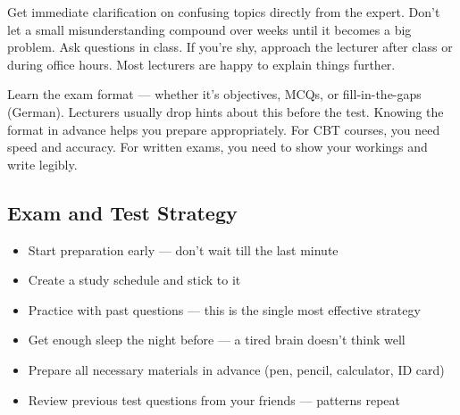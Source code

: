 \documentclass[11pt,a4paper]{article}
\begin{document}
\begin{tcolorbox}[colback=lightGray,colframe=primary,title={\color{white}\textbf{Ask Questions}},colbacktitle=primary,arc=4pt,breakable]
Get immediate clarification on confusing topics directly from the expert. Don't let a small misunderstanding compound over weeks until it becomes a big problem. Ask questions in class. If you're shy, approach the lecturer after class or during office hours. Most lecturers are happy to explain things further.
\end{tcolorbox}

\begin{tcolorbox}[colback=lightGray,colframe=primary,title={\color{white}\textbf{Test Structure}},colbacktitle=primary,arc=4pt,breakable]
Learn the exam format --- whether it's objectives, MCQs, or fill-in-the-gaps (German). Lecturers usually drop hints about this before the test. Knowing the format in advance helps you prepare appropriately. For CBT courses, you need speed and accuracy. For written exams, you need to show your workings and write legibly.
\end{tcolorbox}

\subsection*{Exam and Test Strategy}

\begin{tcolorbox}[colback=lightGray,colframe=primary,title={\color{white}\textbf{�� Before Tests/Exams}},colbacktitle=primary,arc=4pt,breakable]
\begin{itemize}[leftmargin=1em, itemsep=0.3em]
    \item Start preparation early --- don't wait till the last minute
    \item Create a study schedule and stick to it
    \item Practice with past questions --- this is the single most effective strategy
    \item Get enough sleep the night before --- a tired brain doesn't think well
    \item Prepare all necessary materials in advance (pen, pencil, calculator, ID card)
    \item Review previous test questions from your friends --- patterns repeat
\end{itemize}
\end{tcolorbox}
\end{document}
